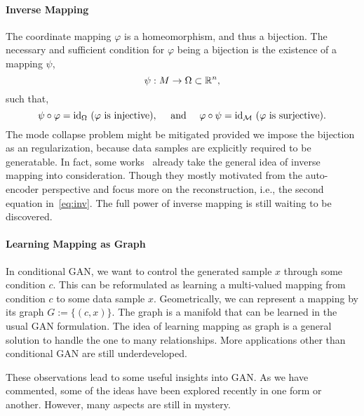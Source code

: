 \paragraph{Inverse Mapping}
The coordinate mapping $\varphi$ is a homeomorphism,
and thus a bijection.
The necessary and sufficient condition for $\varphi$ being a bijection is
the existence of a mapping $\psi$,
\begin{equation}
    \psi:M\to \Omega\subset{\mathbb{R}}^n,
\end{equation}
such that,
\begin{equation}\label{eq:inv}
    \psi\circ\varphi = {\mathop{\mathrm{id}}}_\Omega ~
    (\varphi\text{ is injective}), \quad\text{ and } \quad
    \varphi\circ\psi = {\mathop{\mathrm{id}}}_{\mathcal{M}} ~
    (\varphi\text{ is surjective}).
\end{equation}
The mode collapse problem might be mitigated
provided we impose the bijection as an regularization,
because data samples are explicitly required to be generatable.
In fact,
some works~\cite{huang2016stacked,che2016mode,kim2017learning,
perarnau2016invertible,zhu2016generative}
already take the general idea of inverse mapping into consideration.
Though they mostly motivated from the auto-encoder perspective
and focus more on the reconstruction,
i.e., the second equation in~\eqref{eq:inv}.
The full power of inverse mapping is still waiting to be discovered.

\paragraph{Learning Mapping as Graph}
In conditional GAN,
we want to control the generated sample $x$ through some condition $c$.
This can be reformulated as learning a multi-valued mapping
from condition $c$ to some data sample $x$.
Geometrically,
we can represent a mapping by its graph $G:=\{(c,x)\}$.
The graph is a manifold that can be learned in the usual GAN formulation.
The idea of learning mapping as graph is a general solution to
handle the one to many relationships.
More applications other than conditional GAN are still underdeveloped.

These observations lead to some useful insights into GAN.
As we have commented,
some of the ideas have been explored recently
in one form or another.
However,
many aspects are still in mystery.

